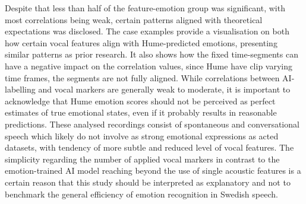 Despite that less than half of the feature-emotion group was significant, with most correlations being weak, certain patterns aligned with theoretical expectations was disclosed. The case examples provide a visualisation on both how certain vocal features align with Hume-predicted emotions, presenting similar patterns as prior research. It also shows how the fixed time-segments can have a negative impact on the correlation values, since Hume have clip varying time frames, the segments are not fully aligned.  
While correlations between AI-labelling and vocal markers are generally weak to moderate, it is important to acknowledge that Hume emotion scores should not be perceived as perfect estimates of true emotional states, even if it probably results in reasonable predictions. 
These analysed recordings consist of spontaneous and conversational speech which likely do not involve as strong emotional expressions as acted datasets, with tendency of more subtle and reduced level of vocal features. The simplicity regarding the number of applied vocal markers in contrast to the emotion-trained AI model reaching beyond the use of single acoustic features is a certain reason that this study should be interpreted as explanatory and not to benchmark the general efficiency of emotion recognition in Swedish speech.    
